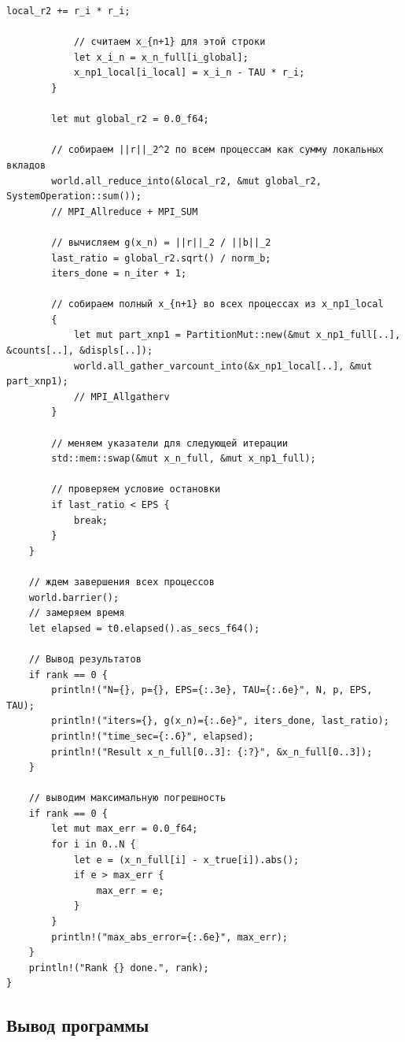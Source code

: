 \documentclass[a4paper, 14pt]{extarticle}
\begin{document}
\begin{lstlisting}[caption={Исходный код программы}, label={lst:source_code}]
            local_r2 += r_i * r_i;

            // считаем x_{n+1} для этой строки
            let x_i_n = x_n_full[i_global];
            x_np1_local[i_local] = x_i_n - TAU * r_i;
        }

        let mut global_r2 = 0.0_f64;

        // собираем ||r||_2^2 по всем процессам как сумму локальных вкладов
        world.all_reduce_into(&local_r2, &mut global_r2, SystemOperation::sum());
        // MPI_Allreduce + MPI_SUM

        // вычисляем g(x_n) = ||r||_2 / ||b||_2
        last_ratio = global_r2.sqrt() / norm_b;
        iters_done = n_iter + 1;

        // собираем полный x_{n+1} во всех процессах из x_np1_local
        {
            let mut part_xnp1 = PartitionMut::new(&mut x_np1_full[..], &counts[..], &displs[..]);
            world.all_gather_varcount_into(&x_np1_local[..], &mut part_xnp1);
            // MPI_Allgatherv
        }

        // меняем указатели для следующей итерации
        std::mem::swap(&mut x_n_full, &mut x_np1_full);

        // проверяем условие остановки
        if last_ratio < EPS {
            break;
        }
    }

    // ждем завершения всех процессов
    world.barrier();
    // замеряем время
    let elapsed = t0.elapsed().as_secs_f64();

    // Вывод результатов
    if rank == 0 {
        println!("N={}, p={}, EPS={:.3e}, TAU={:.6e}", N, p, EPS, TAU);
        println!("iters={}, g(x_n)={:.6e}", iters_done, last_ratio);
        println!("time_sec={:.6}", elapsed);
        println!("Result x_n_full[0..3]: {:?}", &x_n_full[0..3]);
    }

    // выводим максимальную погрешность
    if rank == 0 {
        let mut max_err = 0.0_f64;
        for i in 0..N {
            let e = (x_n_full[i] - x_true[i]).abs();
            if e > max_err {
                max_err = e;
            }
        }
        println!("max_abs_error={:.6e}", max_err);
    }
    println!("Rank {} done.", rank);
}
\end{lstlisting}

\subsection*{Вывод программы}\label{Subsect::program_output}
\end{document}
